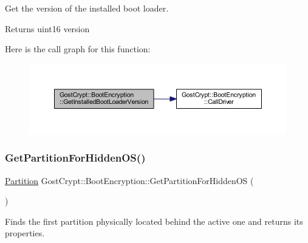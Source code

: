 Get the version of the installed boot loader. 

\begin{DoxyReturn}{Returns}
uint16 version 
\end{DoxyReturn}
Here is the call graph for this function\+:
\nopagebreak
\begin{figure}[H]
\begin{center}
\leavevmode
\includegraphics[width=350pt]{class_gost_crypt_1_1_boot_encryption_a438cec2387d7aab246d986d2a0128b21_cgraph}
\end{center}
\end{figure}
\mbox{\label{class_gost_crypt_1_1_boot_encryption_a4af9421f27c8e568add543c8b09602b3}} 
\subsubsection{\texorpdfstring{Get\+Partition\+For\+Hidden\+O\+S()}{GetPartitionForHiddenOS()}}
{\footnotesize\ttfamily \hyperlink{struct_gost_crypt_1_1_partition}{Partition} Gost\+Crypt\+::\+Boot\+Encryption\+::\+Get\+Partition\+For\+Hidden\+OS (\begin{DoxyParamCaption}{ }\end{DoxyParamCaption})}



Finds the first partition physically located behind the active one and returns its properties. 

